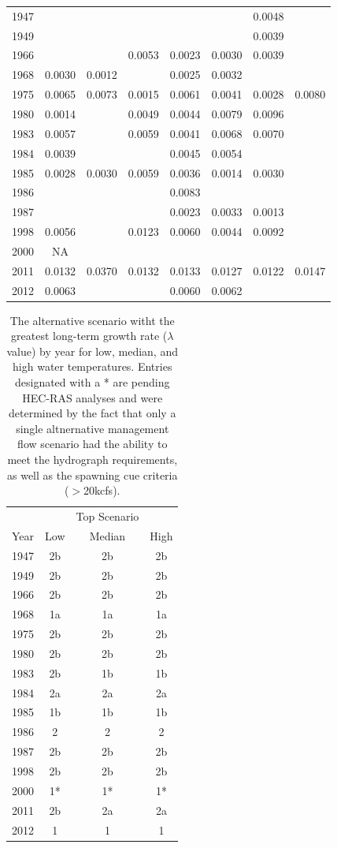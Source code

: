 \documentclass[12pt]{article}
\begin{document}
\begin{table}[h!]
\begin{tabular}{cccccccc}
1947	& & & & & & 0.0048 &\\
1949	& & & & & & 0.0039 &\\
1966	& & & 0.0053 & 0.0023 & 0.0030 & 0.0039 & \\
1968	& 0.0030 &	0.0012	&		&	0.0025 & 0.0032 & & \\
1975	& 0.0065 & 0.0073	& 0.0015 &	0.0061	& 0.0041 & 0.0028 & 0.0080\\
1980	& 0.0014 & & 0.0049	&	0.0044	& 0.0079 & 0.0096 & \\
1983	& 0.0057 & & 0.0059	&	0.0041	& 0.0068 & 0.0070 & \\
1984	& 0.0039 & & & 0.0045 & 0.0054 & & \\
1985	&0.0028 & 0.0030 & 0.0059 & 0.0036 & 0.0014 & 0.0030 & \\
1986	& & & & 0.0083 & & & \\
1987	& & & & 0.0023 & 0.0033 & 0.0013 & \\
1998	& 0.0056 & & 0.0123 & 0.0060 & 0.0044 & 0.0092 & \\
2000	& NA & & & & & & \\	
2011	& 0.0132 & 0.0370 & 0.0132 &	0.0133 & 0.0127 & 0.0122 & 0.0147\\
2012	& 0.0063 & & & 0.0060 & 0.0062	& & \\
\hline
\end{tabular}
\end{table}


\newpage
\begin{table}[h]
\caption{The alternative scenario witht the greatest long-term growth rate ($\lambda$ value) by year for low, median, and high water temperatures.  Entries designated with a * are pending HEC-RAS analyses and were determined by the fact that only a single altnernative management flow scenario had the ability to meet the hydrograph requirements, as well as the spawning cue criteria ($>$20kcfs).}
\centering
\begin{tabular}{cccc}
\hline
& & Top Scenario & \\
Year & Low & Median & High\\
\hline
1947	&	2b	&	2b	&	2b	\\
1949	&	2b	&	2b	&	2b	\\
1966	&	2b	&	2b	&	2b	\\
1968	&	1a	&	1a	&	1a	\\
1975	&	2b	&	2b	&	2b	\\
1980	&	2b	&	2b	&	2b	\\
1983	&	2b	&	1b	&	1b	\\
1984	&	2a	&	2a	&	2a	\\
1985	&	1b	&	1b	&	1b	\\
1986	&	2	&	2	&	2	\\
1987	&	2b	&	2b	&	2b	\\
1998	&	2b	&	2b	&	2b	\\
2000	&	1*	&	1*	&	1*	\\
2011	&	2b	&	2a	&	2a	\\
2012	&	1	&	1	&	1	\\

\hline
\end{tabular}
\end{table}
\end{document}
